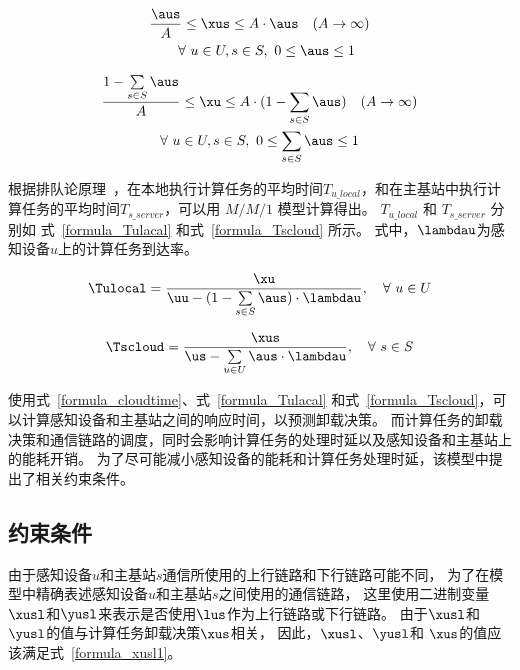 \begin{equation}
  \label{formula_xus}
  \begin{gathered}
  \frac{\aus}{A} \leq \xus \leq A \cdot \aus \quad (A \to \infty) \\
  \quad \forall \ u \in U, s \in S, \ 0\leq \aus \leq 1
  \end{gathered}
\end{equation}

\begin{equation}
\label{formula_xu}
\begin{gathered}
\frac{1 - \sum\limits_{s \in S}{\aus}}{A} \leq \xu \leq A \cdot (1 - \sum_{s \in S}{\aus}) \quad (A \to \infty) \\
\forall\ u \in U, s \in S, \ 0\leq \sum_{s \in S}{\aus} \leq 1
\end{gathered}
\end{equation}

根据排队论原理~\cite{Queueing:systems}，在本地执行计算任务的平均时间$T_{u\_local}$，和在主基站中执行计算任务的平均时间$T_{s\_server}$，可以用 $M/M/1$ 模型计算得出。
$T_{u\_local}$ 和 $T_{s\_server}$ 分别如
式~\eqref{formula_Tulacal} 和式~\eqref{formula_Tscloud} 所示。
式中，$\lambdau$为感知设备$u$上的计算任务到达率。

\begin{equation}
\label{formula_Tulacal}
\Tulocal = \frac{\xu}{\uu - (1 - \sum\limits_{s \in S} \aus) \cdot \lambdau}, \quad \forall \ u \in U
\end{equation}


\begin{equation}
\label{formula_Tscloud}
\Tscloud = \frac{\xus}{\us - \sum\limits_{u \in U} \aus \cdot \lambdau}, \quad \forall \ s \in S
\end{equation}

使用式~\eqref{formula_cloudtime}、式~\eqref{formula_Tulacal} 和式~\eqref{formula_Tscloud}，可以计算感知设备和主基站之间的响应时间，以预测卸载决策。
而计算任务的卸载决策和通信链路的调度，同时会影响计算任务的处理时延以及感知设备和主基站上的能耗开销。
为了尽可能减小感知设备的能耗和计算任务处理时延，该模型中提出了相关约束条件。

\subsection{约束条件}
\label{Constraints}

由于感知设备$u$和主基站$s$通信所使用的上行链路和下行链路可能不同，
为了在模型中精确表述感知设备$u$和主基站$s$之间使用的通信链路，
这里使用二进制变量$\xusl$和$\yusl$来表示是否使用$\lus$作为上行链路或下行链路。
由于$\xusl$和$\yusl$的值与计算任务卸载决策$\xus$相关，
因此，$\xusl$、$\yusl$和 $\xus$的值应该满足式~\eqref{formula_xusl1}。


